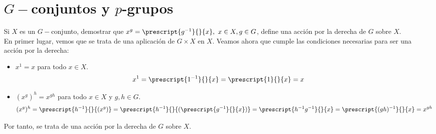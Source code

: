 \section{$G-$conjuntos y $p$-grupos}

\begin{ejercicio}\label{ej:6.1}
    Si $X$ es un $G-$conjunto, demostrar que $x^g = \prescript{g^{-1}}{}{x},~ x \in X, g \in G$, define una acción por la derecha de $G$ sobre $X$.\\

    En primer lugar, vemos que se trata de una aplicación de $G \times X$ en $X$. Veamos ahora que cumple las condiciones necesarias para ser una acción por la derecha:
    \begin{itemize}
        \item $x^1 = x$ para todo $x \in X$.
        \begin{equation*}
            x^1 = \prescript{1^{-1}}{}{x} = \prescript{1}{}{x} = x
        \end{equation*}

        \item $(x^g)^h = x^{gh}$ para todo $x \in X$ y $g, h \in G$.
        \begin{equation*}
            (x^g)^h = \prescript{h^{-1}}{}{(x^g)} = \prescript{h^{-1}}{}{(\prescript{g^{-1}}{}{x})} = \prescript{h^{-1}g^{-1}}{}{x} =  \prescript{(gh)^{-1}}{}{x} = x^{gh}
        \end{equation*}
    \end{itemize}

    Por tanto, se trata de una acción por la derecha de $G$ sobre $X$.
\end{ejercicio}

